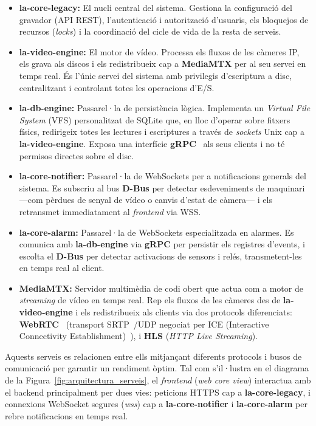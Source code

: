 \begin{itemize}
    \item \textbf{la-core-legacy:} El nucli central del sistema. Gestiona la configuració del gravador (API REST), l'autenticació i autorització d'usuaris, els bloquejos de recursos (\textit{locks}) i la coordinació del cicle de vida de la resta de serveis.
    \item \textbf{la-video-engine:} El motor de vídeo. Processa els fluxos de les càmeres IP, els grava als discos i els redistribueix cap a \textbf{MediaMTX} per al seu servei en temps real. És l'únic servei del sistema amb privilegis d'escriptura a disc, centralitzant i controlant totes les operacions d'E/S.
    \item \textbf{la-db-engine:} Passarel·la de persistència lògica. Implementa un \textit{Virtual File System} (VFS) personalitzat de SQLite que, en lloc d'operar sobre fitxers físics, redirigeix totes les lectures i escriptures a través de \textit{sockets} Unix cap a \textbf{la-video-engine}. Exposa una interfície \textbf{gRPC}~\cite{grpc_up_running,rfc9113} als seus clients i no té permisos directes sobre el disc.
    \item \textbf{la-core-notifier:} Passarel·la de WebSockets per a notificacions generals del sistema. Es subscriu al bus \textbf{D-Bus} per detectar esdeveniments de maquinari —com pèrdues de senyal de vídeo o canvis d'estat de càmera— i els retransmet immediatament al \textit{frontend} via WSS.
    \item \textbf{la-core-alarm:} Passarel·la de WebSockets especialitzada en alarmes. Es comunica amb \textbf{la-db-engine} via \textbf{gRPC} per persistir els registres d'events, i escolta el \textbf{D-Bus} per detectar activacions de sensors i relés, transmetent-les en temps real al client.
    \item \textbf{MediaMTX:} Servidor multimèdia de codi obert que actua com a motor de \textit{streaming} de vídeo en temps real. Rep els fluxos de les càmeres des de \textbf{la-video-engine} i els redistribueix als clients via dos protocols diferenciats: \textbf{WebRTC}~\cite{webrtc_w3c} (transport SRTP~\cite{rfc3711}/UDP negociat per ICE (Interactive Connectivity Establishment)~\cite{rfc8445}), i \textbf{HLS} (\textit{HTTP Live Streaming}).
\end{itemize}

Aquests serveis es relacionen entre ells mitjançant diferents protocols i busos de comunicació per garantir un rendiment òptim. Tal com s'il·lustra en el diagrama de la Figura~\ref{fig:arquitectura_serveis}, el \textit{frontend} (\textit{web core view}) interactua amb el backend principalment per dues vies: peticions HTTPS cap a \textbf{la-core-legacy}, i connexions WebSocket segures (\textit{wss}) cap a \textbf{la-core-notifier} i \textbf{la-core-alarm} per rebre notificacions en temps real.

